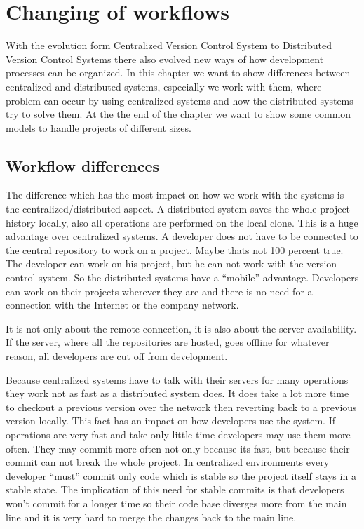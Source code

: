 \section{Changing of workflows}

With the evolution form Centralized Version Control System to Distributed Version Control Systems there also 
evolved new ways of how development processes can be organized. In this chapter we want to show differences 
between centralized and distributed systems, especially we work with them, where problem can occur by using 
centralized systems and how the distributed systems try to solve them. At the the end of the chapter we want 
to show some common models to handle projects of different sizes.

\subsection{Workflow differences}

The difference which has the most impact on how we work with the systems is the centralized/distributed aspect. 
A distributed system saves the whole project history locally, also all operations are performed on the local clone. 
This is a huge advantage over centralized systems. A developer does not have to be connected to the central 
repository to work on a project. Maybe thats not 100 percent true. The developer can work on his project, but 
he can not work with the version control system. So the distributed systems have a “mobile” advantage. 
Developers can work on their projects wherever they are and there is no need for a connection with the 
Internet or the company network.

It is not only about the remote connection, it is also about the server availability. If the server, where 
all the repositories are hosted, goes offline for whatever reason, all developers are cut off from development.

Because centralized systems have to talk with their servers for many operations they work not as fast as 
a distributed system does. It does take a lot more time to checkout a previous version over the network 
then reverting back to a previous version locally. This fact has an impact on how developers use the system. 
If operations are very fast and take only little time developers may use them more often. They may commit 
more often not only because its fast, but because their commit can not break the whole project. 
In centralized environments every developer “must” commit only code which is stable so the project 
itself stays in a stable state. The implication of this need for stable commits is that developers won't 
commit for a longer time so their code base diverges more from the main line and it is very hard 
to merge the changes back to the main line.


